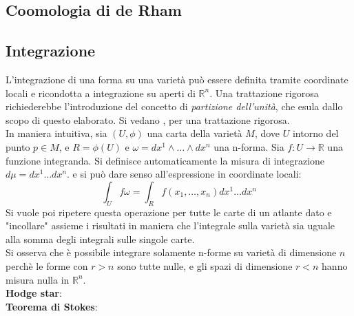 \subsection{Coomologia di de Rham}
\subsection{Integrazione}
L'integrazione di una forma su una varietà può essere definita
tramite coordinate locali e ricondotta a integrazione su aperti di $\mathbb{R}^n$.
Una trattazione rigorosa richiederebbe l'introduzione del concetto di
\emph{partizione dell'unità}, che esula dallo scopo di questo elaborato.
Si vedano \cite{boothby},\cite{nakahara} per una trattazione rigorosa. \\
In maniera intuitiva, sia $(U,\phi)$ una carta della
varietà $M$, dove $U$ intorno del punto $p \in M$, e $R = \phi(U)$ e
$\omega = dx^1 \wedge \dots \wedge dx^n$ una n-forma.
Sia $f : U \to \mathbb{R}$ una funzione integranda.
Si definisce automaticamente la misura di integrazione $d\mu = dx^1 \dots dx^n$.
e si può dare senso all'espressione in coordinate locali:
$$
   \int_U f\omega = \int_R f(x_1,\dots,x_n) dx^1 \dots dx ^n
$$
Si vuole poi ripetere questa operazione per tutte le carte di un atlante dato e
"incollare" assieme i risultati in maniera che l'integrale sulla varietà sia uguale
alla somma degli integrali sulle singole carte.\\

Si osserva che è possibile integrare solamente n-forme su varietà di dimensione $n$
perchè le forme con $r>n$ sono tutte nulle, e gli spazi di dimensione $r<n$ hanno
misura nulla in $\mathbb{R}^n$.\\

\textbf{Hodge star}:\\
\textbf{Teorema di Stokes}:\\
